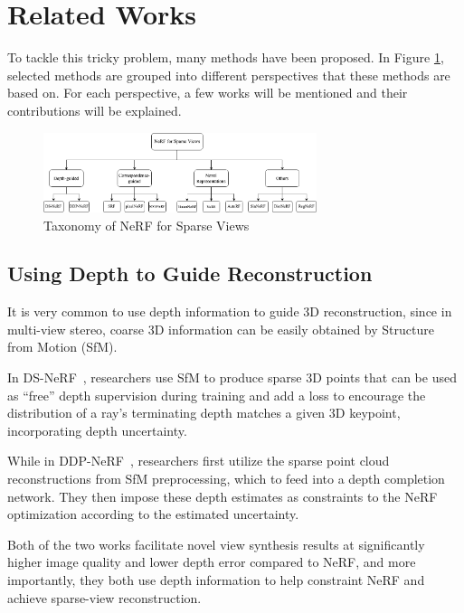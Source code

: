 \documentclass[10pt,twocolumn,letterpaper]{article}
\begin{document}
\section{Related Works}

To tackle this tricky problem, many methods have been proposed.
In Figure \ref{fig:taxonomy}, selected methods are grouped into different perspectives that these methods are based on.
For each perspective, a few works will be mentioned and their contributions will be explained.

\begin{figure}[h]
   \begin{center}
      \includegraphics[width=80mm]{assets/taxonomy.png}
   \end{center}
   \caption{Taxonomy of NeRF for Sparse Views}
   \label{fig:taxonomy}
\end{figure}

\subsection{Using Depth to Guide Reconstruction}

It is very common to use depth information to guide 3D reconstruction, since in multi-view stereo, coarse 3D information can be easily obtained by Structure from Motion (SfM).

In DS-NeRF~\cite{kangle2021dsnerf}, researchers use SfM to produce sparse 3D points that can be used as “free” depth supervision during training
and add a loss to encourage the distribution of a ray’s terminating depth matches a given 3D keypoint, incorporating depth uncertainty.

While in DDP-NeRF~\cite{Roessle_2022_CVPR}, researchers first utilize the sparse point cloud reconstructions from SfM preprocessing, which to feed into a depth completion network. They then impose these depth estimates as constraints to the NeRF optimization according to the estimated uncertainty.

Both of the two works facilitate novel view synthesis results at significantly higher image quality and lower depth error compared to NeRF, and more importantly, they both use depth information to help constraint NeRF and achieve sparse-view reconstruction.
\end{document}
